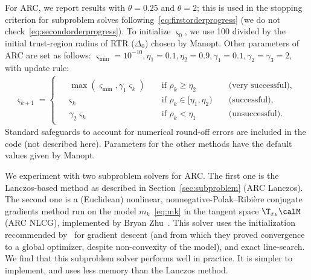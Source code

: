 For ARC, we report results with $\theta = 0.25$ and $\theta = 2$; this is used in the stopping criterion for subproblem solves following~\eqref{eq:firstorderprogress} (we do not check~\eqref{eq:secondorderprogress}). To initialize $\varsigma_0$, we use 100 divided by the initial trust-region radius of RTR ($\Delta_0$) chosen by Manopt. Other parameters of ARC are set as follows: $\varsigma_{\min} = 10^{-10}, \eta_1 = 0.1, \eta_2 = 0.9, \gamma_1 = 0.1, \gamma_2 = \gamma_3 = 2$, with update rule:
\begin{align}
\varsigma_{k+1} =
\begin{cases}
\begin{aligned}
& \max(\varsigma_{\min}, \gamma_1 \varsigma_k) & & \textrm{ if } \rho_k \geq \eta_2 & & \textrm{ (very successful),} \\
& \varsigma_k & & \textrm{ if } \rho_k \in [\eta_1, \eta_2) & & \textrm{ (successful),} \\
& \gamma_2 \varsigma_k & & \textrm{ if } \rho_k < \eta_1 & & \textrm{ (unsuccessful).}
\end{aligned}
\end{cases}
\end{align}
Standard safeguards to account for numerical round-off errors are included in the code (not described here). Parameters for the other methods have the default values given by Manopt.

We experiment with two subproblem solvers for ARC. The first one is the Lanczos-based method as described in Section~\ref{sec:subproblem} (ARC Lanczos). The second one is a (Euclidean) nonlinear, nonnegative-Polak--Ribi\`ere conjugate gradients method run on the model $m_k$~\eqref{eq:mk} in the tangent space $\T_{x_k}\calM$ (ARC NLCG), implemented by Bryan Zhu~\citep{zhu2019arcthesis}. This solver uses the initialization recommended by~\citet{carmon2016gradient} for gradient descent (and from which they proved convergence to a global optimizer, despite non-convexity of the model), and exact line-search.
We find that this subproblem solver performs well in practice. It is simpler to implement, and uses less memory than the Lanczos method.








